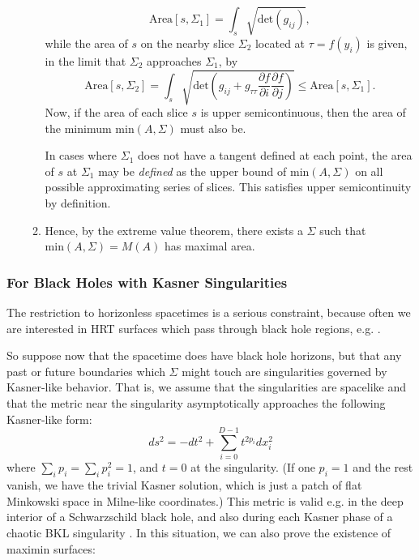 \documentclass[12pt]{article}
\begin{document}
\begin{enumerate}[resume]
\begin{enumerate}
\begin{equation}
\mathrm{Area}[s, \Sigma_1] = \int_{s} \sqrt{\mathrm{det}(g_{ij})},
\end{equation}
while the area of $s$ on the nearby slice $\Sigma_2$ located at $\tau = f(y_i)$ is given, in the limit that $\Sigma_2$ approaches $\Sigma_1$, by
\begin{equation}\label{sigma_2}
\mathrm{Area}[s, \Sigma_2] = \int_{s} \sqrt{ \mathrm{det} 
\left( g_{ij} + g_{\tau\tau} \frac{\partial f}{\partial i}\frac{\partial f}{\partial j} \right) } \le \mathrm{Area}[s, \Sigma_1].
\end{equation}
Now, if the area of each slice $s$ is upper semicontinuous, then the area of the minimum $\mathrm{min}(A,\Sigma)$ must also be.  

In cases where $\Sigma_1$ does not have a tangent defined at each point, the area of $s$ at $\Sigma_1$ may be \emph{defined} as the upper bound of $\mathrm{min}(A,\Sigma)$ on all possible approximating series of slices.  This satisfies upper semicontinuity by definition.
	\item Hence, by the extreme value theorem, there exists a $\Sigma$ such that $\mathrm{min}(A,\Sigma) = M(A)$ has maximal area.
	\end{enumerate}
\end{enumerate}

\subsubsection{For Black Holes with Kasner Singularities}\label{Kasner}

The restriction to horizonless spacetimes is a serious constraint, because often we are interested in HRT surfaces which pass through black hole regions, e.g. \cite{HM13}.

So suppose now that the spacetime does have black hole horizons, but that any past or future boundaries which $\Sigma$ might touch are singularities governed by Kasner-like behavior.  That is, we assume that the singularities are spacelike and that the metric near the singularity asymptotically approaches the following Kasner-like form:
\begin{equation}
ds^2 = -dt^2 + \sum_{i=0}^{D-1} t^{2p_i} dx_i^2
\end{equation}
where $\sum_i p_i = \sum_i p_i^2 = 1$, and $t = 0$ at the singularity.  (If one $p_i = 1$ and the rest vanish, we have the trivial Kasner solution, which is just a patch of flat Minkowski space in Milne-like coordinates.) This metric is valid e.g. in the deep interior of a Schwarzschild black hole, and also during each Kasner phase of a chaotic BKL singularity \cite{BKL70}.  In this situation, we can also prove the existence of maximin surfaces:
\end{document}
